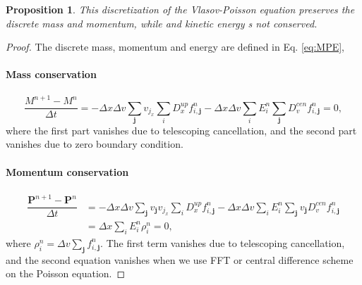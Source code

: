 \documentclass[10pt,a4paper]{amsart}
\newtheorem{proposition}{Proposition}
\begin{document}
\begin{proposition}
    This discretization of the Vlasov-Poisson equation preserves the discrete mass and momentum, while and kinetic energy s not conserved.
\end{proposition}

\begin{proof}
The discrete mass, momentum and energy are defined in Eq. \eqref{eq:MPE},


\paragraph{Mass conservation}

\begin{equation}
    \dfrac{M^{n+1}-M^n}{\Delta t} = - \Delta x \Delta v \sum_{\bm{j}} v_{j_{x}} \sum_{i} D_{x}^{up} f_{i,\bm{j}}^{n} - \Delta x \Delta v \sum_{i} E_{i}^{n} \sum_{\bm{j}} D_{v}^{cen} f_{i,\bm{j}}^{n} = 0 ,
\end{equation}
where the first part vanishes due to telescoping cancellation, and the second part vanishes due to zero boundary condition.


\paragraph{Momentum conservation}

\begin{equation}
\begin{aligned}
    \dfrac{\bm P^{n+1}-\bm P^n}{\Delta t} &= - \Delta x \Delta v \sum_{\bm{j}} v_{\bm{j}} v_{j_{x}} \sum_{i} D_{x}^{up} f_{i,\bm{j}}^{n} - \Delta x \Delta v \sum_{i} E_{i}^{n} \sum_{\bm{j}} v_{\bm{j}} D_{v}^{cen} f_{i,\bm{j}}^{n} \\
    &= \Delta x \sum_{i} E_{i}^{n} \rho_{i}^{n} = 0 ,
\end{aligned}
\end{equation}
where $\rho_{i}^{n} = \Delta v \sum_{\bm{j}} f_{i,\bm{j}}^{n}$.
The first term vanishes due to telescoping cancellation, and the second equation vanishes when we use FFT or central difference scheme on the Poisson equation.



\end{proof}
\end{document}
